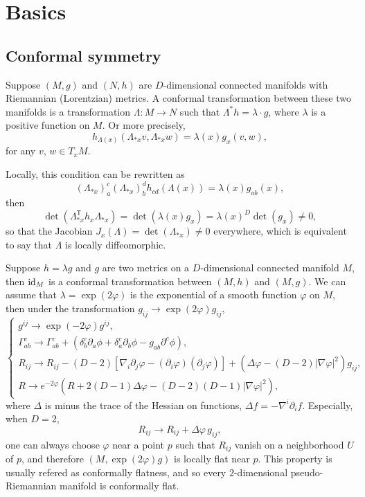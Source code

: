 \chapter{Basics}

\section{Conformal symmetry}


\begin{definition}
	Suppose $(M,g)$ and $(N,h)$ are $D$-dimensional connected manifolds
	with Riemannian (Lorentzian) metrics.
	A conformal transformation between these two manifolds
	is a transformation $\Lambda:M\to N$ such that
	$\Lambda^*h=\lambda\cdot g$, where $\lambda$ is a positive function on $M$.
 	Or more precisely,
	\[
		h_{\Lambda(x)}(\Lambda_{*x}v,\Lambda_{*x}w)=\lambda(x)g_x(v,w),
	\]
	for any $v$, $w\in T_x M$.
\end{definition}

Locally, this condition can be rewritten as 
\[
	(\Lambda_{*x})^c_{a}(\Lambda_{*x})^d_{b}h_{cd}(\Lambda(x))=\lambda(x)g_{ab}(x),
\]
then 
\[
	\det(\Lambda_{*x}^{\mathsf{T}}h_x\Lambda_{*x})
	=\det(\lambda(x) g_x)=\lambda(x)^D \det(g_x)\neq 0,
\]
so that the Jacobian $J_x(\Lambda)=\det(\Lambda_{*x})\neq 0$ everywhere,
which is equivalent to say that $\Lambda$ is locally diffeomorphic.

Suppose $h=\lambda g$ and $g$ are two metrics on a 
$D$-dimensional connected manifold $M$, then $\operatorname{id}_M$ is a conformal
transformation between $(M,h)$ and $(M,g)$.
We can assume that $\lambda = \exp(2\varphi)$ is 
the exponential of a smooth function $\varphi$ on $M$, then
under the transformation $g_{ij}\to \exp(2\varphi)g_{ij}$,
\[
\begin{cases}
	g^{ij}\to \exp(-2\varphi)g^{ij},\\
	\Gamma_{ab}^{c}\to \Gamma_{ab}^{c}+\left(\delta _{b}^{c}\partial _{a}\phi +\delta _{a}^{c}\partial _{b}\phi -{g}_{ab}\partial ^{c}\phi \right),\\
	{R}_{ij}\to R_{ij}-(D-2)\left[\nabla _{i}\partial _{j}\varphi -(\partial _{i}\varphi )(\partial _{j}\varphi )\right]+\left(\Delta \varphi -(D-2)|\nabla \varphi |^{2}\right)g_{ij},\\
	R\to e^{-2\varphi }\left(R+2(D-1)\Delta \varphi -(D-2)(D-1)|\nabla \varphi |^{2}\right),
\end{cases}
\]
where $\Delta$ is minus the trace of the Hessian on functions, $\Delta f=-\nabla^i\partial_i f$. Especially, when $D=2$,
\[
	R_{ij}\to R_{ij}+\Delta \varphi \,g_{ij},
\]
one can always choose $\varphi$ near a point $p$ such that $R_{ij}$ vanish
on a neighborhood $U$ of $p$, and therefore $(M,\exp(2\varphi)g)$ is 
locally flat near $p$. This property is usually refered as conformally flatness, and so every $2$-dimensional pseudo-Riemannian manifold is conformally flat.

